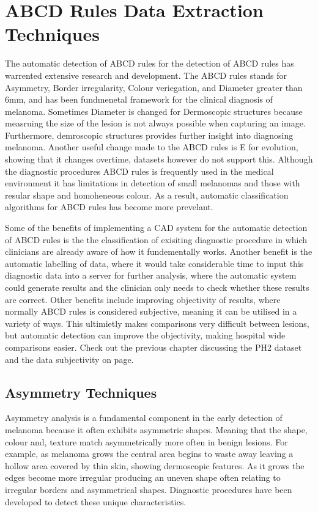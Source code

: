 \section{ABCD Rules Data Extraction Techniques}
The automatic detection of ABCD rules for the detection of ABCD rules has warrented extensive research and development\cite{Ali2020}. The ABCD rules stands for Asymmetry, Border irregularity, Colour veriegation, and Diameter greater than 6mm, and has been fundmenetal framework for the clinical diagnosis of melanoma. Sometimes Diameter is changed for Dermoscopic structures because measruing the size of the lesion is not always possible when capturing an image. Furthermore, demroscopic structures provides further insight into diagnosing melanoma\cite{}. Another useful change made to the ABCD rules is E for evolution, showing that it changes overtime, datasets however do not support this. Although the diagnostic procedures ABCD rules is frequently used in the medical environment it has limitations in detection of small melanomas and those with resular shape and homoheneous colour\cite{Dermoscopy Improves Accuracy of Primary Care Physicians to Triage Lesions Suggestive of Skin Cancer}. As a result, automatic classification algorithms for ABCD rules has become more prevelant\cite{Kasmi2016}.

Some of the benefits of implementing a CAD system for the automatic detection of ABCD rules is the the classification of exisiting diagnostic procedure in which clinicians are already aware of how it fundementally works. Another benefit is the automatic labelling of data, where it would take considerable time to input this diagnostic data into a server for further analysis, where the automatic system could generate results and the clinician only needs to check whether these results are correct. Other benefits include improving objectivity of results, where normally ABCD rules is considered subjective, meaning it can be utilised in a variety of ways. This ultimietly makes comparisons very difficult between lesions, but automatic detection can improve the objectivity, making hospital wide comparisons easier. Check out the previous chapter discussing the PH2 dataset and the data subjectivity on page\pageref*{ph2-image-assessment}.


\subsection{Asymmetry Techniques}
Asymmetry analysis is a fundamental component in the early detection of melanoma because it often exhibits asymmetric shapes\cite{Ali2020a}. Meaning that the shape, colour and, texture match asymmetrically more often in benign lesions. For example, as melanoma grows the central area begins to waste away leaving a hollow area covered by thin skin, showing dermoscopic features. As it grows the edges become more irregular producing an uneven shape often relating to irregular borders and asymmetrical shapes. Diagnostic procedures have been developed to detect these unique characteristics.

